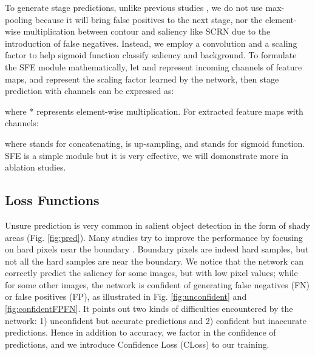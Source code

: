 \documentclass[10pt,twocolumn,letterpaper]{article}
\begin{document}
To generate stage predictions, unlike previous studies \cite{SHM}\cite{POOLNET}\cite{ITSD}, we do not use max-pooling because it will bring false positives to the next stage, nor the element-wise multiplication between contour and saliency like SCRN \cite{SCRN} due to the introduction of false negatives. Instead, we employ a  convolution and a scaling factor to help sigmoid function classify saliency and background. To formulate the SFE module mathematically, let  and  represent incoming  channels of feature maps, and  represent the scaling factor learned by the network, then stage prediction  with  channels can be expressed as:


where * represents element-wise multiplication.  For extracted feature maps  with  channels:

where  stands for concatenating,  is up-sampling, and  stands for sigmoid function.
SFE is a simple module but it is very effective, we will domonstrate more in ablation studies.


\subsection{Loss Functions}

Unsure prediction is very common in salient object detection in the form of shady areas (Fig. \ref{fig:pred}). Many studies try to improve the performance by focusing on hard pixels near the boundary \cite{CTLoss}\cite{F3NET}. Boundary pixels are indeed hard samples, but not all the hard samples are near the boundary. We notice that the network can correctly predict the saliency for some images, but with low pixel values; while for some other images, the network is confident of generating false negatives (FN) or false positives (FP), as illustrated in Fig. \ref{fig:unconfident} and \ref{fig:confidentFPFN}. It points out two kinds of difficulties encountered by the network: 1) unconfident but accurate predictions and 2) confident but inaccurate predictions. Hence in addition to accuracy,  we factor in the confidence of predictions, and we introduce Confidence Loss (CLoss) to our training.
\end{document}
